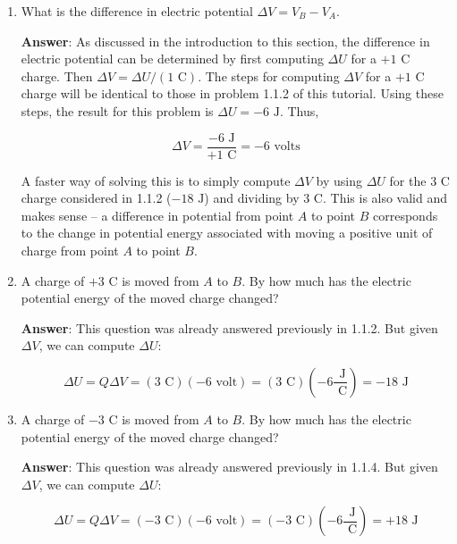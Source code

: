 \documentclass{article}
\begin{document}


\begin{enumerate}

  \item What is the difference in electric potential $\Delta V = V_B-V_A$.

        \ifsolutions
        {\bf Answer}: As discussed in the introduction to this section, the difference in electric potential can be determined by first computing $\Delta U$ for a $+1\text{ C}$ charge. Then $\Delta V = \Delta U/(1\text{ C})$. The steps for computing $\Delta V$ for a $+1\text{ C}$ charge will be identical to those in problem 1.1.2 of this tutorial. Using these steps, the result for this problem is $\Delta U=-6\text{ J}$. Thus,

        $$\Delta V = \frac{-6\text{ J}}{+1\text{ C}}= -6\text{ volts}$$

        A faster way of solving this is to simply compute $\Delta V$ by using $\Delta U$ for the $3\text{ C}$ charge considered in 1.1.2 ($-18\text{ J}$) and dividing by $3\text{ C}$. This is also valid and makes sense -- a difference in potential from point $A$ to point $B$ corresponds to the change in potential energy associated with moving a positive unit of charge from point $A$ to point $B$.
        \else

        \vskip 48pt
        \fi

  \item A charge of $+3\text{ C}$ is moved from $A$ to $B$. By how much has the electric potential energy of the moved charge changed?

        \ifsolutions
        {\bf Answer}: This question was already answered previously in 1.1.2. But given $\Delta V$, we can compute $\Delta U$:

        $$\Delta U = Q\Delta V=(3\text{ C})(-6\text{ volt})=(3\text{ C})\left(-6\frac{\text{ J}}{ \text{ C}}\right)=-18\text{ J}$$
        \else

        \vskip 48pt
        \fi

  \item A charge of $-3\text{ C}$ is moved from $A$ to $B$. By how much has the electric potential energy of the moved charge changed?

        \ifsolutions
        {\bf Answer}: This question was already answered previously in 1.1.4. But given $\Delta V$, we can compute $\Delta U$:

        $$
         \Delta U = Q\Delta V=(-3\text{ C})(-6\text{ volt})=(-3\text{ C})\left(-6\frac{\text{ J}}{ \text{ C}}\right)=+18\text{ J}
        $$
        \else


\end{enumerate}
\end{document}
